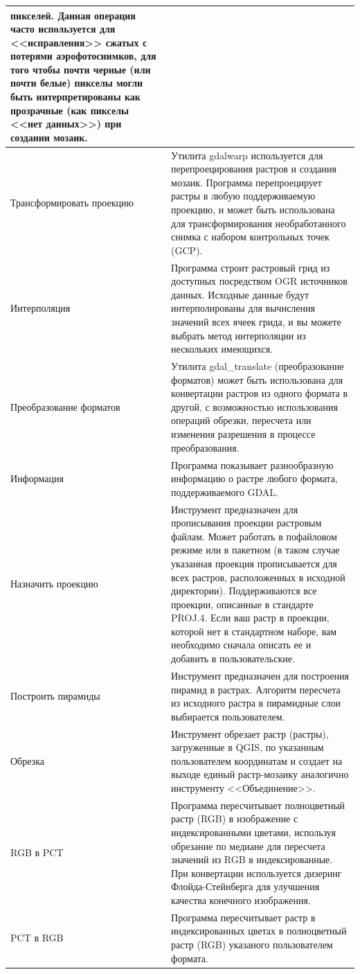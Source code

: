 {\begin{longtable}{|p{3cm}|p{13cm}|}
 пикселей. Данная операция часто используется для <<исправления>> сжатых с
 потерями аэрофотоснимков, для того чтобы почти черные (или почти белые)
 пикселы могли быть интерпретированы как прозрачные (как пикселы <<нет данных>>)
 при создании мозаик.\\
\hline Трансформировать проекцию & Утилита gdalwarp используется для
 перепроецирования растров и создания мозаик. Программа перепроецирует растры
 в любую поддерживаемую проекцию, и может быть использована для трансформирования
 необработанного снимка с набором контрольных точек (GCP). \\
\hline Интерполяция & Программа строит растровый грид из доступных посредством
 OGR источников данных. Исходные данные будут интерполированы для вычисления
 значений всех ячеек грида, и вы можете выбрать метод интерполяции из нескольких
 имеющихся.\\
\hline Преобразование форматов & Утилита gdal\_translate (преобразование
 форматов) может быть использована для конвертации растров из одного формата в
 другой, с возможностью использования операций обрезки, пересчета или изменения
 разрешения в процессе преобразования.\\
\hline Информация & Программа показывает разнообразную информацию о растре
 любого формата, поддерживаемого GDAL. \\
\hline Назначить проекцию &  Инструмент предназначен для прописывания проекции
 растровым файлам. Может работать в пофайловом режиме или в пакетном (в таком
 случае указанная проекция прописывается для всех растров, расположенных в
 исходной директории). Поддерживаются все проекции, описанные в стандарте
 PROJ.4. Если ваш растр в проекции, которой нет в стандартном наборе, вам
 необходимо сначала описать ее и добавить в пользовательские. \\
\hline Построить пирамиды &  Инструмент предназначен для построения пирамид в
 растрах. Алгоритм пересчета из исходного растра в пирамидные слои выбирается
 пользователем.\\
\hline Обрезка & Инструмент обрезает растр (растры), загруженные в QGIS, по
 указанным пользователем координатам и создает на выходе единый растр-мозаику
 аналогично инструменту <<Объединение>>. \\
\hline RGB в PCT &  Программа пересчитывает полноцветный растр (RGB) в изображение
 с индексированными цветами, используя обрезание по медиане для пересчета значений
 из RGB в индексированные. При конвертации используется дизеринг Флойда-Стейнберга
 для улучшения качества конечного изображения. \\
\hline PCT в RGB &  Программа пересчитывает растр в индексированных цветах в
 полноцветный растр (RGB) указаного пользователем формата.\\
\hline
\end{longtable}

}
